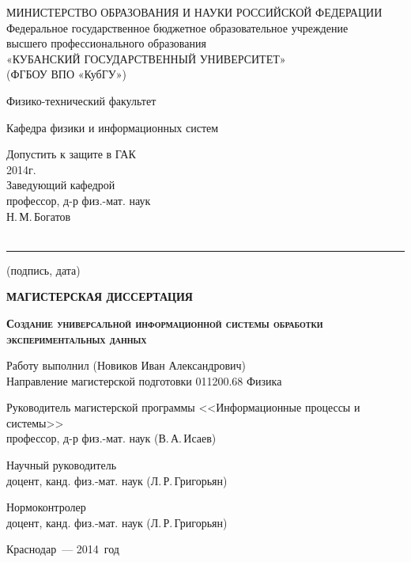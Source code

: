 \documentclass[a4paper, 14pt, titlepage]{extarticle}
\author{\theauthor, кафедра физики и информационных систем КубГУ}
\title{\thetitle}
\newcommand{\thetitle}{Создание универсальной информационной системы обработки экспериментальных данных}
\begin{document}

  \thispagestyle{empty}
  \begin {center}
  \small{МИНИСТЕРСТВО ОБРАЗОВАНИЯ И НАУКИ РОССИЙСКОЙ ФЕДЕРАЦИИ}\\
  Федеральное государственное бюджетное образовательное учреждение\\
  высшего профессионального образования\\
  «КУБАНСКИЙ ГОСУДАРСТВЕННЫЙ УНИВЕРСИТЕТ»\\
  (ФГБОУ ВПО «КубГУ»)

  Физико-технический факультет

  \vspace {1cm}

  Кафедра физики и информационных систем

  \vspace {1cm}

  \hfill
  \begin{minipage}{7cm}
    \begin{flushleft}
      Допустить к защите в ГАК\\
      \hspace*{0mm}\hrulefill{} 2014г.\\
      Заведующий кафедрой\\
      профессор, д-р физ.-мат. наук\\
      Н.\,М.\,Богатов \hrulefill{}\\
      ~\hrule
      \footnotesize{\centering (подпись, дата)\par}
    \end{flushleft}
  \end{minipage}

  \vspace {1.5cm}

  \textbf{МАГИСТЕРСКАЯ ДИССЕРТАЦИЯ}

  \vspace {0.5cm}

  \textbf{ \large \scshape \thetitle }

  \vspace {1.5cm}

  \begin{flushleft}
    Работу выполнил \hrulefill{}  (Новиков Иван Александрович)\\
    Направление магистерской подготовки 011200.68 Физика

    Руководитель магистерской программы <<Информационные процессы и системы>>\\
    профессор, д-р физ.-мат. наук \hrulefill{} (В.\,А.\,Исаев)

    Научный руководитель\\
    доцент, канд. физ.-мат. наук \hrulefill{} (Л.\,Р.\,Григорьян)

    Нормоконтролер\\
    доцент, канд. физ.-мат. наук \hrulefill{} (Л.\,Р.\,Григорьян)
  \end{flushleft}

  \vfill

  Краснодар~--- 2014~год
  \end {center}
\end{document}
